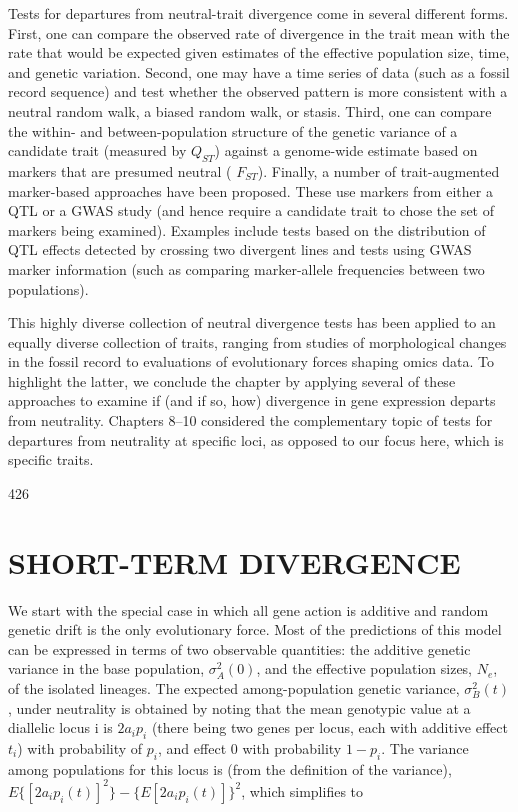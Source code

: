 \documentclass{article}
\begin{document}
Tests for departures from neutral-trait divergence come in several different forms. First, one can compare the observed rate of divergence in the trait mean with the rate that would be expected given estimates of the effective population size, time, and genetic variation. Second, one may have a time series of data (such as a fossil record sequence) and test whether the observed pattern is more consistent with a neutral random walk, a biased random walk, or stasis. Third, one can compare the within- and between-population structure of the genetic variance of a candidate trait (measured by  $ Q_{ST} $) against a genome-wide estimate based on markers that are presumed neutral ( $ F_{ST} $). Finally, a number of trait-augmented marker-based approaches have been proposed. These use markers from either a QTL or a GWAS study (and hence require a candidate trait to chose the set of markers being examined). Examples include tests based on the distribution of QTL effects detected by crossing two divergent lines and tests using GWAS marker information (such as comparing marker-allele frequencies between two populations).

This highly diverse collection of neutral divergence tests has been applied to an equally diverse collection of traits, ranging from studies of morphological changes in the fossil record to evaluations of evolutionary forces shaping omics data. To highlight the latter, we conclude the chapter by applying several of these approaches to examine if (and if so, how) divergence in gene expression departs from neutrality. Chapters 8–10 considered the complementary topic of tests for departures from neutrality at specific loci, as opposed to our focus here, which is specific traits.

426

\section{SHORT-TERM DIVERGENCE}
We start with the special case in which all gene action is additive and random genetic drift is the only evolutionary force. Most of the predictions of this model can be expressed in terms of two observable quantities: the additive genetic variance in the base population,  $ \sigma_A^2(0) $, and the effective population sizes,  $ N_e $, of the isolated lineages. The expected among-population genetic variance,  $ \sigma_B^2(t) $, under neutrality is obtained by noting that the mean genotypic value at a diallelic locus i is  $ 2a_i p_i $ (there being two genes per locus, each with additive effect  $ t_i $) with probability of  $ p_i $, and effect 0 with probability  $ 1 - p_i $. The variance among populations for this locus is (from the definition of the variance),  $ E\{[2a_i p_i(t)]^2\} - \{E[2a_i p_i(t)]\}^2 $, which simplifies to
\end{document}
